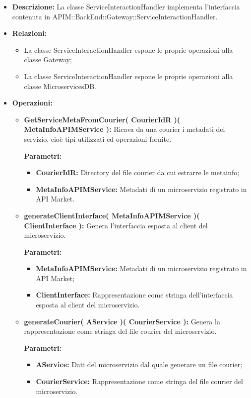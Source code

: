 \begin{itemize}
	\item \textbf{Descrizione:} La classe ServiceInteractionHandler implementa l'interfaccia contenuta in APIM::BackEnd::Gateway::ServiceInteractionHandler.
	\item \textbf{Relazioni:}
		\begin{itemize}
			\item La classe ServiceInteractionHandler espone le proprie operazioni alla classe Gateway;
			\item La classe ServiceInteractionHandler espone le proprie operazioni alla classe MicroservicesDB.
		\end{itemize}
	\item \textbf{Operazioni:}
		\begin{itemize}
			\item \textbf{GetServiceMetaFromCourier( CourierIdR )( MetaInfoAPIMService ):} Ricava da una courier i metadati del servizio, cioè tipi utilizzati ed operazioni fornite.
				\begin{description}
    				\item[\textbf{Parametri:}]
				\end{description}
				\begin{itemize}
					\item \textbf{CourierIdR:} Directory del file courier da cui estrarre le metainfo;
					\item \textbf{MetaInfoAPIMService:} Metadati di un microservizio registrato in API Market.
				\end{itemize}
			\item \textbf{generateClientInterface( MetaInfoAPIMService )( ClientInterface ):} Genera l'interfaccia esposta al client del microservizio.
				\begin{description}
    				\item[\textbf{Parametri:}]
				\end{description}
				\begin{itemize}
					\item \textbf{MetaInfoAPIMService:} Metadati di un microservizio registrato in API Market;
					\item \textbf{ClientInterface:} Rappresentazione come stringa dell'interfaccia esposta al client del microservizio.
				\end{itemize}
			\item \textbf{generateCourier( AService )( CourierService ):} Genera la rappresentazione come stringa del file courier del microservizio.
				\begin{description}
    				\item[\textbf{Parametri:}]
				\end{description}
				\begin{itemize}
					\item \textbf{AService:} Dati del microservizio dal quale generare un file courier;
					\item \textbf{CourierService:} Rappresentazione come stringa del file courier del microservizio.
				\end{itemize}
		\end{itemize}
\end{itemize}


